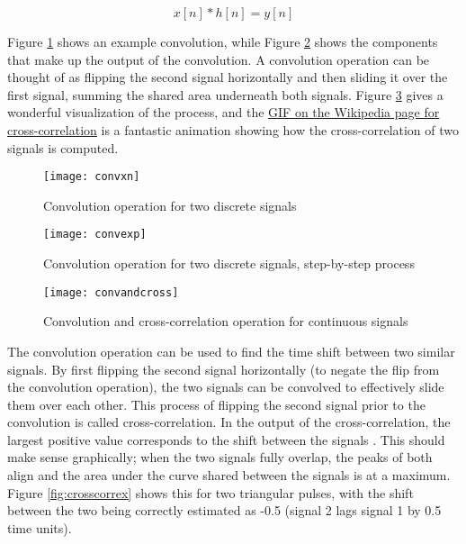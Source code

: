 \documentclass[11pt]{ucthesisCP}
\begin{document}
\begin{equation} \label{eq:3eq1}
	x[n] * h[n] = y[n]
\end{equation}

Figure \ref{fig:convxn} shows an example convolution, while Figure \ref{fig:convexp} shows the components that make up the output of the convolution. A convolution operation can be thought of as flipping the second signal horizontally and then sliding it over the first signal, summing the shared area underneath both signals. Figure \ref{fig:convandcross} gives a wonderful visualization of the process, and the \href{https://en.wikipedia.org/wiki/Cross-correlation#/media/File:Cross_correlation_animation.gif}{\ul{GIF on the Wikipedia page for cross-correlation}} is a fantastic animation showing how the cross-correlation of two signals is computed. 

\begin{figure}[htbp!]
	\centering
	\texttt{[image: convxn]}
	\caption{Convolution operation for two discrete signals \cite{dspguide}}
	\label{fig:convxn}
\end{figure}

\begin{figure}[htbp!]
	\centering
	\texttt{[image: convexp]}
	\caption{Convolution operation for two discrete signals, step-by-step process \cite{dspguide}}
	\label{fig:convexp}
\end{figure}

\begin{figure}[htbp]
	\centering
	\texttt{[image: convandcross]}
	\caption{Convolution and cross-correlation operation for continuous signals \cite{wikicross}}
	\label{fig:convandcross}
\end{figure}

The convolution operation can be used to find the time shift between two similar signals. By first flipping the second signal horizontally (to negate the flip from the convolution operation), the two signals can be convolved to effectively slide them over each other. This process of flipping the second signal prior to the convolution is called cross-correlation. In the output of the cross-correlation, the largest positive value corresponds to the shift between the signals \cite{dspguide}. This should make sense graphically; when the two signals fully overlap, the peaks of both align and the area under the curve shared between the signals is at a maximum. Figure \ref{fig:crosscorrex} shows this for two triangular pulses, with the shift between the two being correctly estimated as -0.5 (signal 2 lags signal 1 by 0.5 time units).
\end{document}
